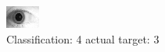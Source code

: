 \begin{figure}[h!]
\begin{center}
\includegraphics[width=0.60\columnwidth]{figures/ID1962_class_4_target_3.png}
\end{center}
\caption{ Classification: 4 actual target: 3}
\label{fig:ID1962_class_4_target_3}
\end{figure}
